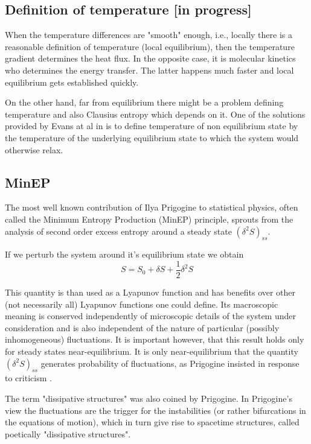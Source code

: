 \documentclass[a4paper,12pt]{article}
\begin{document}
\subsection{Definition of temperature [in progress]}
When the temperature differences are "smooth" enough, i.e., locally there is a reasonable definition of temperature (local equilibrium), then the temperature gradient determines the heat flux. In the opposite case, it is molecular kinetics who determines the energy transfer. The latter happens much faster and local equilibrium gets established quickly.

On the other hand, far from equilibrium there might be a problem defining temperature and also Clausius entropy which depends on it. One of the solutions provided by Evans at al in  is to define temperature of non equilibrium state by the temperature of the underlying equilibrium state to which the system would otherwise relax.

\subsection{MinEP}

The most well known contribution of Ilya Prigogine to statistical physics, often called the Minimum Entropy Production (MinEP) principle, sprouts from the analysis of second order excess entropy around a steady state $ (\delta^2 S)_{ss} $. 

If we perturb the system around it's equilibrium state we obtain
\begin{equation}
  S=S_0 + \delta S + \frac{1}{2}\delta^2 S
\end{equation}

This quantity is than used as a Lyapunov function and has benefits over other (not necessarily all) Lyapunov functions one could define. 
Its macroscopic meaning is conserved independently of microscopic details of the system under consideration and is also independent of the nature of particular (possibly inhomogeneous) fluctuations.
It is important however, that this result holds only for steady states near-equilibrium. It is only near-equilibrium that the quantity $ (\delta^2 S)_{ss} $ generates probability of fluctuations, as Prigogine insisted in response to criticism \cite{Nicolis:1979cv}. 

The term "dissipative structures" was also coined by Prigogine.
In Prigogine's view the fluctuations are the trigger for the instabilities (or rather bifurcations in the equations of motion), which in turn give rise to spacetime structures, called poetically "dissipative structures". 
\end{document}
